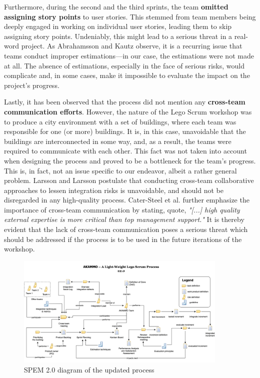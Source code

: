 \documentclass[conference]{IEEEtran}
\begin{document}
Furthermore, during the second and the third sprints, the team \textbf{omitted
assigning story points} to user stories. This stemmed from team members being
deeply engaged in working on individual user stories, leading them to skip
assigning story points. Undeniably, this might lead to a serious threat in a
real-word project. As Abrahamsson and Kautz \cite{Abrahamsson2002} observe, it
is a recurring issue that teams conduct improper estimations---in our case, the
estimations were not made at all. The absence of estimations, especially in the
face of serious risks, would complicate and, in some cases, make it impossible
to evaluate the impact on the project's progress.

Lastly, it has been observed that the process did not mention any
\textbf{cross-team communication efforts}. However, the nature of the Lego
Scrum workshop was to produce a city environment with a set of buildings, where
each team was responsible for one (or more) buildings. It is, in this case,
unavoidable that the buildings are interconnected in some way, and, as a
result, the teams were required to communicate with each other. This fact was
not taken into account when designing the process and proved to be a bottleneck
for the team's progress. This is, in fact, not an issue specific to our
endeavor, albeit a rather general problem. Larsson and Larsson
\cite{Larsson2020} postulate that conducting cross-team collaborative
approaches to lessen integration risks is unavoidable, and should not be
disregarded in any high-quality process. Cater-Steel et al.
\cite{CaterSteel2006} further emphasize the importance of cross-team
communication by stating, quote, \textit{"[...] high quality external expertise
is more critical than top management support."} It is thereby evident that the
lack of cross-team communication poses a serious threat which should be
addressed if the process is to be used in the future iterations of the
workshop.

\begin{figure}
	\centering
	\includegraphics[width=0.9\textwidth]{process-diagram.png}
  \caption{SPEM 2.0 diagram of the updated process}
	\label{fig:process-diagram}
\end{figure}
\end{document}
